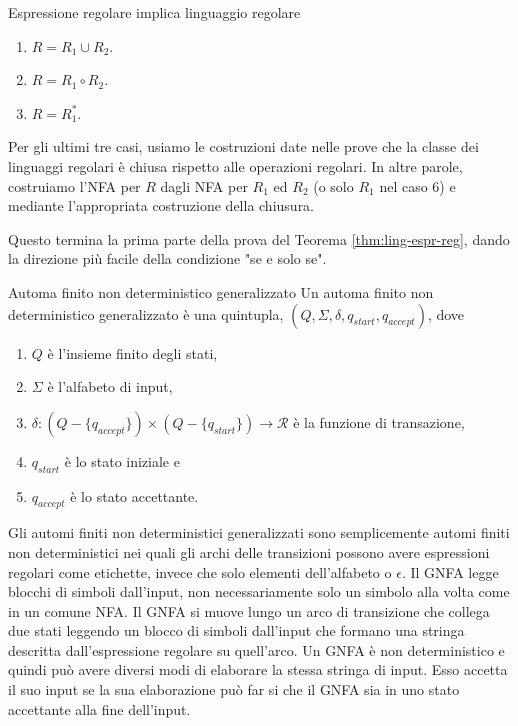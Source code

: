 \begin{Lemma}{Espressione regolare implica linguaggio regolare}{}
\begin{demonstration}
\begin{enumerate}
    Formalmente, $N= (\{q\}, \Sigma, \delta, q, \emptyset)$, dove $\delta(r, b) = \emptyset$ per ogni $r$ e $b$.

    \item $R=R_1\cup R_2$.
    \item $R=R_1\circ R_2$.
    \item $R=R_1^*$.
\end{enumerate}

Per gli ultimi tre casi, usiamo le costruzioni date nelle prove che la classe dei linguaggi regolari è chiusa rispetto alle operazioni regolari. In altre parole, costruiamo l'NFA per $R$ dagli NFA per $R_1$ ed $R_2$ (o solo $R_1$ nel caso 6) e mediante l'appropriata costruzione della chiusura.
\end{demonstration}
\end{Lemma}

Questo termina la prima parte della prova del Teorema \ref{thm:ling-espr-reg}, dando la direzione più facile della condizione "se e solo se".

\begin{Definition}{Automa finito non deterministico generalizzato}{}
Un automa finito non deterministico generalizzato è una quintupla, $(Q,\Sigma, \delta, q_{start}, q_{accept})$, dove
\begin{enumerate}
    \item $Q$ è l'insieme finito degli stati,
    \item $\Sigma$ è l'alfabeto di input,
    \item $\delta:(Q - \{q_{accept}\})\times (Q-\{q_{start}\}) \longrightarrow \mathcal{R}$ è la funzione di transazione,
    \item $q_{start}$ è lo stato iniziale e
    \item $q_{accept}$ è lo stato accettante.
\end{enumerate}
\end{Definition}

Gli automi finiti non deterministici generalizzati sono semplicemente automi finiti non deterministici nei quali gli archi delle transizioni possono avere espressioni regolari come etichette, invece che solo elementi dell'alfabeto o $\epsilon$. Il GNFA legge blocchi di simboli dall'input, non necessariamente solo un simbolo alla volta come in un comune NFA. Il GNFA si muove lungo un arco di transizione che collega due stati leggendo un blocco di simboli dall'input che formano una stringa descritta dall'espressione regolare su quell'arco. Un GNFA è non deterministico e quindi può avere diversi modi di elaborare la stessa stringa di input. Esso accetta il suo input se la sua elaborazione può far si che il GNFA sia in uno stato accettante alla fine dell'input.

